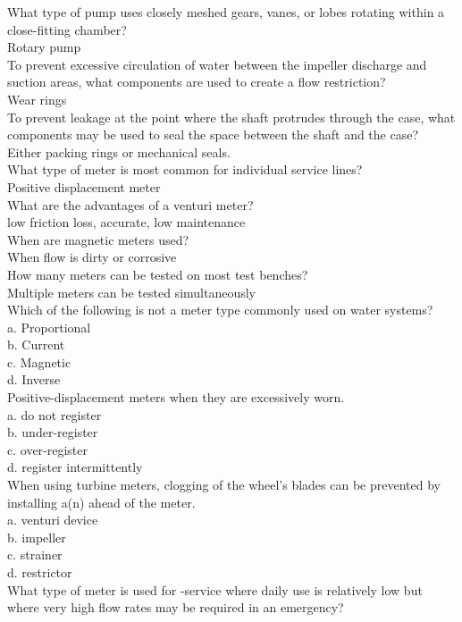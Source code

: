 What type of pump uses closely meshed gears, vanes, or lobes rotating within a close-fitting chamber?\\
Rotary pump\\
To prevent excessive circulation of water between the impeller discharge and suction areas, what components are used to create a flow restriction?\\
Wear rings\\
To prevent leakage at the point where the shaft protrudes through the case, what components may be used to seal the space between the shaft and the case?\\
Either packing rings or mechanical seals.\\
What type of meter is most common for individual service lines?\\
Positive displacement meter\\
What are the advantages of a venturi meter?\\
low friction loss, accurate, low maintenance\\
When are magnetic meters used?\\
When flow is dirty or corrosive\\
How many meters can be tested on most test benches?\\
Multiple meters can be tested simultaneously\\
Which of the following is not a meter type commonly used on water systems?\\
a.	Proportional\\
b.	Current\\
c.	Magnetic\\
d.	Inverse\\
Positive-displacement meters	when they are excessively worn.\\
a.	do not register\\
b.	under-register\\
c.	over-register\\
d.	register intermittently\\
When using turbine meters, clogging of the wheel's blades can be prevented by installing a(n) ahead of the meter.\\
a.	venturi device\\
b.	impeller\\
c.	strainer\\
d.	restrictor\\
What type of meter is used for -service where daily use is relatively low but where very high flow rates may be required in an emergency?\\
